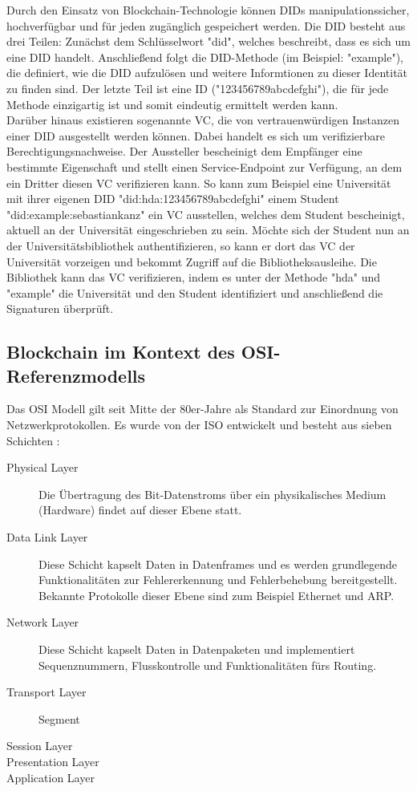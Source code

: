 Durch den Einsatz von Blockchain-Technologie können \ac{DID}s manipulationssicher, hochverfügbar und für jeden zugänglich gespeichert werden. Die \ac{DID} besteht aus drei Teilen: Zunächst dem Schlüsselwort "did", welches beschreibt, dass es sich um eine \ac{DID} handelt. Anschließend folgt die DID-Methode (im Beispiel: "example"), die definiert, wie die \ac{DID} aufzulösen und weitere Informtionen zu dieser Identität zu finden sind. Der letzte Teil ist eine ID ("123456789abcdefghi"), die für jede Methode einzigartig ist und somit eindeutig ermittelt werden kann.\\
Darüber hinaus existieren sogenannte \ac{VC}, die von vertrauenwürdigen Instanzen einer \ac{DID} ausgestellt werden können. Dabei handelt es sich um verifizierbare Berechtigungsnachweise. Der Aussteller bescheinigt dem Empfänger eine bestimmte Eigenschaft und stellt einen Service-Endpoint zur Verfügung, an dem ein Dritter diesen \ac{VC} verifizieren kann. So kann zum Beispiel eine Universität mit ihrer eigenen \ac{DID} "did:hda:123456789abcdefghi" einem Student "did:example:sebastiankanz" ein \ac{VC} ausstellen, welches dem Student bescheinigt, aktuell an der Universität eingeschrieben zu sein. Möchte sich der Student nun an der Universitätsbibliothek authentifizieren, so kann er dort das \ac{VC} der Universität vorzeigen und bekommt Zugriff auf die Bibliotheksausleihe. Die Bibliothek kann das \ac{VC} verifizieren, indem es unter der Methode "hda" und "example" die Universität und den Student identifiziert und anschließend die Signaturen überprüft.

\subsection{Blockchain im Kontext des OSI-Referenzmodells}
\label{subsec:fundamentals:dlt:osi}
Das \ac{OSI} Modell gilt seit Mitte der 80er-Jahre als Standard zur Einordnung von Netzwerkprotokollen. Es wurde von der \ac{ISO} entwickelt und besteht aus sieben Schichten \cite{OSI1980}:
\begin{description}
  \item[Physical Layer] Die Übertragung des Bit-Datenstroms über ein physikalisches Medium (Hardware) findet auf dieser Ebene statt.
  \item[Data Link Layer] Diese Schicht kapselt Daten in Datenframes und es werden grundlegende Funktionalitäten zur Fehlererkennung und Fehlerbehebung bereitgestellt. Bekannte Protokolle dieser Ebene sind zum Beispiel Ethernet und \ac{ARP}.
  \item[Network Layer] Diese Schicht kapselt Daten in Datenpaketen und implementiert Sequenznummern, Flusskontrolle und Funktionalitäten fürs Routing.
  \item[Transport Layer] Segment
  \item[Session Layer]
  \item[Presentation Layer]
  \item[Application Layer]
\end{description}

